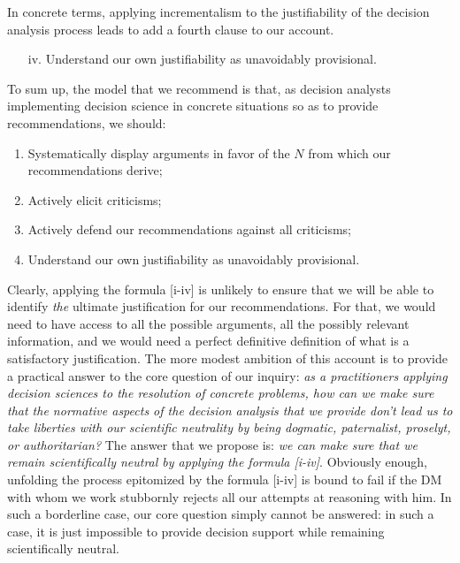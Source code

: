 \documentclass[preprint, french, english, 11pt, authoryear]{elsarticle}%
\begin{document}
In concrete terms, applying incrementalism to the justifiability of the decision analysis process leads to add a fourth clause to our account.
\begin{itemize}
\item[iv.]	Understand our own justifiability as unavoidably provisional.
\end{itemize}

To sum up, the model that we recommend is that, as decision analysts implementing decision science in concrete situations so as to provide recommendations, we should:
\begin{enumerate}[label=\roman*.]
	\item Systematically display arguments in favor of the $N$ from which our recommendations derive;
	\item Actively elicit criticisms;
	\item Actively defend our recommendations against all criticisms;
	\item Understand our own justifiability as unavoidably provisional.
\end{enumerate}

Clearly, applying the formula [i-iv] is unlikely to ensure that we will be able to identify \emph{the} ultimate justification for our recommendations. For that, we would need to have access to all the possible arguments, all the possibly relevant information, and we would need a perfect definitive definition of what is a satisfactory justification.  The more modest ambition of this account is to provide a practical answer to the core question of our inquiry: \emph{as a practitioners applying decision sciences to the resolution of concrete problems, how can we make sure that the normative aspects of the decision analysis that we provide don't lead us to take liberties with our scientific neutrality by being dogmatic, paternalist, proselyt, or authoritarian?} The answer that we propose is: \emph{we can make sure that we remain scientifically neutral by applying the formula [i-iv]}. Obviously enough, unfolding the process epitomized by the formula [i-iv] is bound to fail if the \ac{DM} with whom we work stubbornly rejects all our attempts at reasoning with him. In such a borderline case, our core question simply cannot be answered: in such a case, it is just impossible to provide decision support while remaining scientifically neutral.
\end{document}
